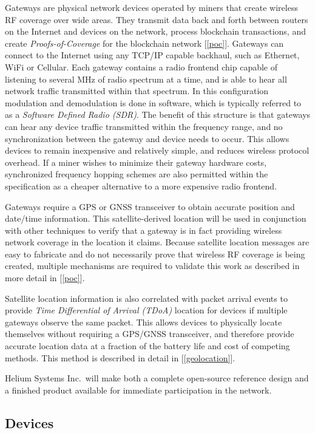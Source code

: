 \documentclass[letterpaper,11pt]{article}
\begin{document}
Gateways are physical network devices operated by miners that create wireless RF coverage over wide areas. They transmit data back and forth between routers on the Internet and devices on the network, process blockchain transactions, and create \emph{Proofs-of-Coverage} for the blockchain network [\ref{poc}]. Gateways can connect to the Internet using any TCP/IP capable backhaul, such as Ethernet, WiFi or Cellular. Each gateway contains a radio frontend chip capable of listening to several MHz of radio spectrum at a time, and is able to hear all network traffic transmitted within that spectrum. In this configuration modulation and demodulation is done in software, which is typically referred to as a \emph{Software Defined Radio (SDR)}. The benefit of this structure is that gateways can hear any device traffic transmitted within the frequency range, and no synchronization between the gateway and device needs to occur. This allows devices to remain inexpensive and relatively simple, and reduces wireless protocol overhead. If a miner wishes to minimize their gateway hardware costs, synchronized frequency hopping schemes are also permitted within the specification as a cheaper alternative to a more expensive radio frontend.

Gateways require a GPS or GNSS transceiver to obtain accurate position and date/time information. This satellite-derived location will be used in conjunction with other techniques to verify that a gateway is in fact providing wireless network coverage in the location it claims. Because satellite location messages are easy to fabricate and do not necessarily prove that wireless RF coverage is being created, multiple mechanisms are required to validate this work as described in more detail in [\ref{poc}].

Satellite location information is also correlated with packet arrival events to provide \emph{Time Differential of Arrival (TDoA)} location for devices if multiple gateways observe the same packet. This allows devices to physically locate themselves without requiring a GPS/GNSS transceiver, and therefore provide accurate location data at a fraction of the battery life and cost of competing methods. This method is described in detail in [\ref{geolocation}].

Helium Systems Inc.\ will make both a complete open-source reference design and a finished product available for immediate participation in the network.

\subsection{Devices}\label{devices}
\end{document}
